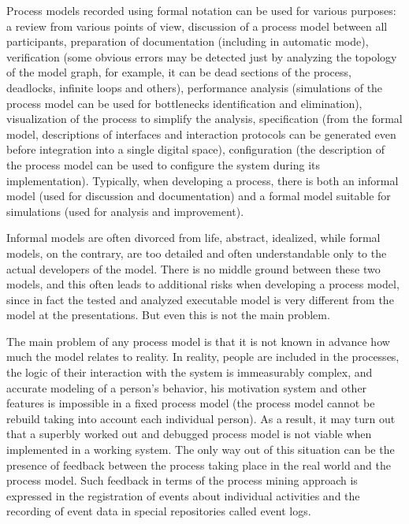 \documentclass[
11pt,%
tightenlines,%
twoside,%
onecolumn,%
nofloats,%
nobibnotes,%
nofootinbib,%
superscriptaddress,%
noshowpacs,%
centertags]%
{revtex4}
\begin{document}
Process models recorded using formal notation can be used for various purposes: a review from various points of view, discussion of a process model between all participants, preparation of documentation (including in automatic mode), verification (some obvious errors may be detected just by analyzing the topology of the model graph, for example, it can be dead sections of the process, deadlocks, infinite loops and others), performance analysis (simulations of the process model can be used for bottlenecks identification and elimination), visualization of the process to simplify the analysis, specification (from the formal model, descriptions of interfaces and interaction protocols can be generated even before integration into a single digital space), configuration (the description of the process model can be used to configure the system during its implementation).
Typically, when developing a process, there is both an informal model (used for discussion and documentation) and a formal model suitable for simulations (used for analysis and improvement). 

Informal models are often divorced from life, abstract, idealized, while formal models, on the contrary, are too detailed and often understandable only to the actual developers of the model.
There is no middle ground between these two models, and this often leads to additional risks when developing a process model, since in fact the tested and analyzed executable model is very different from the model at the presentations.
But even this is not the main problem.

The main problem of any process model is that it is not known in advance how much the model relates to reality.
In reality, people are included in the processes, the logic of their interaction with the system is immeasurably complex, and accurate modeling of a person’s behavior, his motivation system and other features is impossible in a fixed process model (the process model cannot be rebuild taking into account each individual person).
As a result, it may turn out that a superbly worked out and debugged process model is not viable when implemented in a working system.
The only way out of this situation can be the presence of feedback between the process taking place in the real world and the process model.
Such feedback in terms of the process mining approach is expressed in the registration of events about individual activities and the recording of event data in special repositories called event logs.
\end{document}
